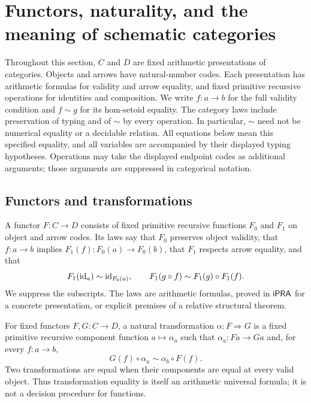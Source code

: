 \section{Functors, naturality, and the meaning of schematic categories}
\label{sec:functors-yoneda-foundation}

Throughout this section, $C$ and $D$ are fixed arithmetic presentations of
categories.  Objects and arrows have natural-number codes.  Each presentation
has arithmetic formulas for validity and arrow equality, and fixed primitive
recursive operations for identities and composition.  We write $f:a\to b$
for the full validity condition and $f\sim g$ for its hom-setoid equality.
The category laws include preservation of typing and of $\sim$ by every
operation.  In particular, $\sim$ need not be numerical equality or a decidable
relation.  All equations below mean this specified equality, and all variables
are accompanied by their displayed typing hypotheses.  Operations may take
the displayed endpoint codes as additional arguments; those arguments are
suppressed in categorical notation.

\subsection{Functors and transformations}

\begin{definition}
A functor $F:C\to D$ consists of fixed primitive recursive functions $F_0$
and $F_1$ on object and arrow codes.  Its laws say that $F_0$ preserves object
validity, that $f:a\to b$ implies $F_1(f):F_0(a)\to F_0(b)$, that $F_1$
respects arrow equality, and that
\[
 F_1(\operatorname{id}_a)\sim\operatorname{id}_{F_0(a)},\qquad
 F_1(g\circ f)\sim F_1(g)\circ F_1(f).
\]
We suppress the subscripts.  The laws are arithmetic formulas, proved in
$\mathsf{iPRA}$ for a concrete presentation, or explicit premises of a relative
structural theorem.
\end{definition}

\begin{definition}
For fixed functors $F,G:C\to D$, a natural transformation $\alpha:F\Rightarrow G$
is a fixed primitive recursive component function $a\mapsto\alpha_a$ such that
$\alpha_a:Fa\to Ga$ and, for every $f:a\to b$,
\begin{equation}
 G(f)\circ\alpha_a\sim\alpha_b\circ F(f).
 \label{eq:ordinary-naturality}
\end{equation}
Two transformations are equal when their components are equal at every valid
object.  Thus transformation equality is itself an arithmetic universal
formula; it is not a decision procedure for functions.
\end{definition}

